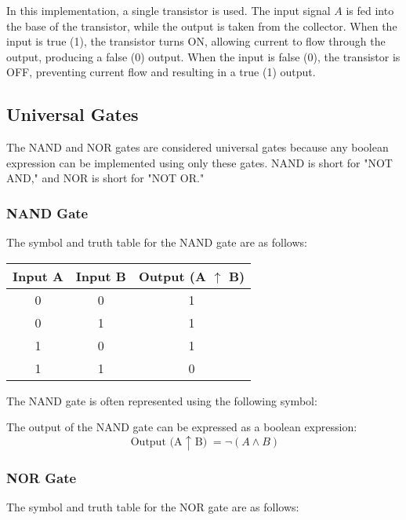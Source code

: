 \documentclass{article}
\begin{document}
In this implementation, a single transistor is used. The input signal $A$ is fed into the base of the transistor, while the output is taken from the collector. When the input is true (1), the transistor turns ON, allowing current to flow through the output, producing a false (0) output. When the input is false (0), the transistor is OFF, preventing current flow and resulting in a true (1) output.

\subsection{Universal Gates}

The NAND and NOR gates are considered universal gates because any boolean expression can be implemented using only these gates. NAND is short for "NOT AND," and NOR is short for "NOT OR."

\subsubsection{NAND Gate}

The symbol and truth table for the NAND gate are as follows:

\begin{center}
  \begin{tabular}{|c|c|c|}
    \hline
    \textbf{Input A} & \textbf{Input B} & \textbf{Output (A $\uparrow$ B)} \\
    \hline
    0 & 0 & 1 \\
    0 & 1 & 1 \\
    1 & 0 & 1 \\
    1 & 1 & 0 \\
    \hline
  \end{tabular}
\end{center}

The NAND gate is often represented using the following symbol:

\begin{center}
\end{center}

The output of the NAND gate can be expressed as a boolean expression:
\[ \text{Output (A $\uparrow$ B)} = \lnot (A \land B) \]

\subsubsection{NOR Gate}

The symbol and truth table for the NOR gate are as follows:
\end{document}

